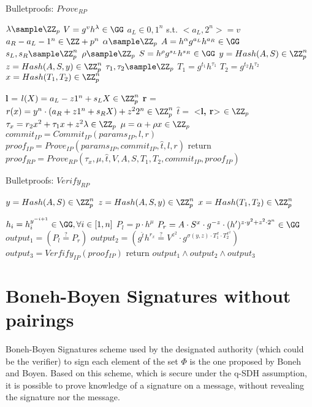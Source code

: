 \begin{algorithm}
 \DontPrintSemicolon
    \caption{Bulletproofs: $Prove_{RP}$}
    \label{alg:prove_rp}
    \LinesNumbered
    
    
    $\lambda \sample \ZZ_p$ \;
    $V = g^vh^\lambda \in \GG$ \;
    $a_L \in {0, 1}^n$ s.t. $<a_L, 2^n> = v$ \;
    $a_R - a_L - 1^n \in \ZZ+p^n$ \;
    $\alpha \sample \ZZ_p$\;
    $A = h^\alpha g^{a_L}h^{a_R} \in \GG$ \;
    $s_L, s_R \sample \ZZ_p^n$\;
    $\rho \sample \ZZ_p$\;
    $S = h^\rho g^{s_L} h^{s_R} \in \GG$ \;
    $ y = Hash(A, S) \in \ZZ_p^n$ \;
    $ z = Hash(A, S, y) \in \ZZ_p^n$ \;
    $\tau_1, \tau_2 \sample \ZZ_p$ \;
    $T_1 = g^{t_1} h^{\tau_1}$ \;
    $T_2 = g^{t_2} h^{\tau_2}$ \;
    $ x = Hash(T_1, T_2) \in \ZZ_p^n$ \;
    
    \textbf{l} = $l(X) = a_L - z1^n + s_LX \in \ZZ_p^n$ \;
    \textbf{r} = $r(x) = y^n \cdot (a_R + z1^n + s_R X) + z^22^n \in \ZZ_p^n$ \;
    $\hat{t} = $ <\textbf{l, r}> $\in \ZZ_p$ \;
    $\tau_x = r_2x^2 + \tau_1 x + z^2\lambda  \in \ZZ_p$ \;
    $\mu = \alpha + \rho x \in \ZZ_p$ \;
    $commit_{IP} = Commit_{IP}(params_{IP}, l, r)$ \;
    $proof_{IP} = Prove_{IP}(params_{IP}, commit_{IP}, \hat{t}, l, r)$ \;
    return $proof_{RP} = Prove_{RP}(\tau_x, \mu, \hat{t}, V, A, S, T_1, T_2, commit_{IP}, proof_{IP})$ \;
\end{algorithm}

\begin{algorithm}
 \DontPrintSemicolon
    \caption{Bulletproofs: $Verify_{RP}$}
    \label{alg:verify_rp}
    \LinesNumbered

    
    $ y = Hash(A, S) \in \ZZ_p^n$ \;
    $ z = Hash(A, S, y) \in \ZZ_p^n$ \;
    $ x = Hash(T_1, T_2) \in \ZZ_p^n$ \;
    
    $h_i = h_i^{y^{-i + 1}} \in \GG, \forall i \in [1, n]$\;
    $P_l = p \cdot h^\mu $\;
    $P_r = A\cdot S^x\cdot g^{-z} \cdot (h')^{z\cdot y^2 + z^2 \cdot 2^n} \in \GG$\;
    $output_1 = (P_l \overset{?}{=}P_r)$ \;
    $output_2 = (g^{\hat{t}} h^{r_x} \overset{?}{=} V^{z^2}\cdot g^{\sigma(y, z)\cdot T_1^x \cdot T_2^{x^2}})$ \;
    $output_3 = Verfify_{IP}(proof_{IP})$ \;
    return $output_1 \land output_2 \land output_3$ 
\end{algorithm}

\section{Boneh-Boyen Signatures without pairings}
\label{appendex: bbs-no-pairing}
Boneh-Boyen Signatures scheme \cite{jao2009boneh} used by the designated authority
(which could be the verifier) to sign each element of the set $\Phi$ is the one proposed by Boneh and Boyen.
Based on this scheme, which is secure under the q-SDH assumption, it is possible to prove knowledge of a
signature on a message, without revealing the signature nor the message.

